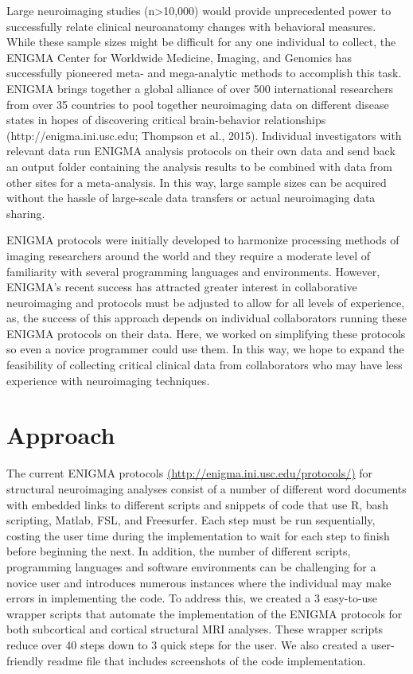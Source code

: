 \documentclass[twocolumn]{bmcart}%
\begin{document}
Large neuroimaging studies (n\textgreater{}10,000) would provide
unprecedented power to successfully relate clinical neuroanatomy changes
with behavioral measures. While these sample sizes might be difficult
for any one individual to collect, the ENIGMA Center for Worldwide
Medicine, Imaging, and Genomics has successfully pioneered meta- and
mega-analytic methods to accomplish this task. ENIGMA brings together a
global alliance of over 500 international researchers from over 35
countries to pool together neuroimaging data on different disease states
in hopes of discovering critical brain-behavior relationships
(http://enigma.ini.usc.edu; Thompson et al., 2015). Individual
investigators with relevant data run ENIGMA analysis protocols on their
own data and send back an output folder containing the analysis results
to be combined with data from other sites for a meta-analysis. In this
way, large sample sizes can be acquired without the hassle of
large-scale data transfers or actual neuroimaging data sharing.

ENIGMA protocols were initially developed to harmonize processing
methods of imaging researchers around the world and they require a
moderate level of familiarity with several programming languages and
environments. However, ENIGMA's recent success has attracted greater
interest in collaborative neuroimaging and protocols must be adjusted to
allow for all levels of experience, as, the success of this approach
depends on individual collaborators running these ENIGMA protocols on
their data. Here, we worked on simplifying these protocols so even a
novice programmer could use them. In this way, we hope to expand the
feasibility of collecting critical clinical data from collaborators who
may have less experience with neuroimaging techniques.

\section{Approach}\label{approach}

The current ENIGMA protocols \url{(http://enigma.ini.usc.edu/protocols/)} for
structural neuroimaging analyses consist of a number of different word
documents with embedded links to different scripts and snippets of code
that use R, bash scripting, Matlab, FSL, and Freesurfer. Each step must
be run sequentially, costing the user time during the implementation to
wait for each step to finish before beginning the next. In addition, the
number of different scripts, programming languages and software
environments can be challenging for a novice user and introduces
numerous instances where the individual may make errors in implementing
the code. To address this, we created a 3 easy-to-use wrapper scripts
that automate the implementation of the ENIGMA protocols for both
subcortical and cortical structural MRI analyses. These wrapper scripts
reduce over 40 steps down to 3 quick steps for the user. We also created
a user-friendly readme file that includes screenshots of the code
implementation.
\end{document}
